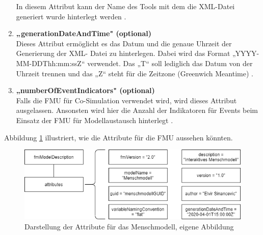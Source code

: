 \begin{enumerate}
	In diesem Attribut kann der Name des Tools mit dem die XML-Datei generiert wurde
	hinterlegt werden \cite[S.33]{25}.
	\item \textbf{„generationDateAndTime" (optional)} \cite[S.33]{25} \\
	Dieses Attribut ermöglicht es das Datum und die genaue Uhrzeit der Generierung der XML-
	Datei zu hinterlegen. Dabei wird das Format „YYYY-MM-DDThh:mm:ssZ“ verwendet. Das
	„T“ soll lediglich das Datum von der Uhrzeit trennen und das „Z“ steht für die Zeitzone
	(Greenwich Meantime) \cite[S.33]{25}.
	\item \textbf{„numberOfEventIndicators" (optional)} \cite[S.33]{25} \\
	Falls die FMU für Co-Simulation verwendet wird, wird dieses Attribut ausgelassen. Ansonsten
	wird hier die Anzahl der Indikatoren für Events beim Einsatz der FMU für Modellaustausch
	hinterlegt \cite[S.33]{25}.
\end{enumerate}
\newpage
\noindent Abbildung \ref{fig:FMUAttribute} illustriert, wie die Attribute für die FMU aussehen könnten.
\begin{figure}[h]
	\centering
	\includegraphics[width=1\linewidth]{Bilder/A24_FMUAttributBeispiel}
	\caption{Darstellung der Attribute für das Menschmodell, eigene Abbildung}
	\label{fig:FMUAttribute}
\end{figure}

